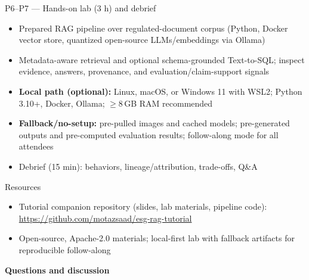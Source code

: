 \documentclass[aspectratio=169]{beamer}
\begin{document}
\begin{frame}{P6--P7 --- Hands-on lab (3 h) and debrief}
  \begin{itemize}
    \item Prepared RAG pipeline over regulated-document corpus (Python, Docker vector store, quantized open-source LLMs/embeddings via Ollama)
    \item Metadata-aware retrieval and optional schema-grounded Text-to-SQL; inspect evidence, answers, provenance, and evaluation/claim-support signals
    \item \textbf{Local path (optional):} Linux, macOS, or Windows 11 with WSL2; Python 3.10+, Docker, Ollama; $\geq$8\,GB RAM recommended
    \item \textbf{Fallback/no-setup:} pre-pulled images and cached models; pre-generated outputs and pre-computed evaluation results; follow-along mode for all attendees
    \item Debrief (15 min): behaviors, lineage/attribution, trade-offs, Q\&A
  \end{itemize}
\end{frame}

\begin{frame}{Resources}
  \begin{itemize}
    \item Tutorial companion repository (slides, lab materials, pipeline code): \url{https://github.com/motazsaad/esg-rag-tutorial}
    \item Open-source, Apache-2.0 materials; local-first lab with fallback artifacts for reproducible follow-along
  \end{itemize}
  \vspace{1em}
  \centering \textbf{Questions and discussion}
\end{frame}
\end{document}
